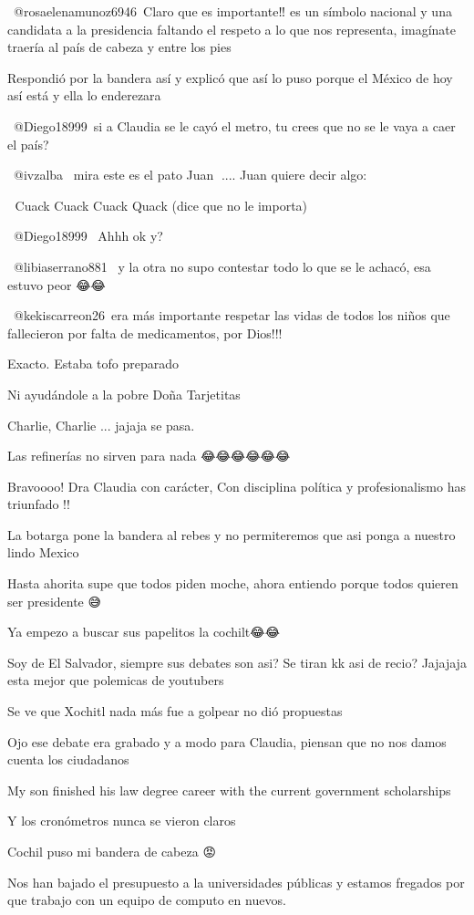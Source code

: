 ​ @rosaelenamunoz6946 Claro que es importante‼️ es un símbolo nacional y una candidata a la presidencia faltando el respeto a lo que nos representa, imagínate traería al país de cabeza y entre los pies

Respondió por la bandera así y explicó que así lo puso porque el México de hoy así está y ella lo enderezara

​ @Diego18999 si a Claudia se le cayó el metro, tu crees que no se le vaya a caer el país?

 @ivzalba  mira este es el pato Juan 🦆.... Juan quiere decir algo:


🦆 Cuack Cuack Cuack Quack (dice que no le importa)

 @Diego18999  Ahhh ok y?🤷🏻‍♀️

​ @libiaserrano881  y la otra no supo contestar todo lo que se le achacó, esa estuvo peor 😂😂

​ @kekiscarreon26 era más importante respetar las vidas de todos los niños que fallecieron por falta de medicamentos, por Dios!!!

Exacto. Estaba tofo preparado

Ni ayudándole a la pobre Doña Tarjetitas

Charlie, Charlie ... jajaja se pasa.

Las refinerías no sirven para nada 😂😂😂😂😂😂

Bravoooo! Dra Claudia con carácter,
Con disciplina política y profesionalismo has triunfado !!

La botarga pone la bandera al rebes y no permiteremos que asi ponga a nuestro lindo Mexico

Hasta ahorita supe que todos piden moche, ahora entiendo porque todos quieren ser presidente 😅

Ya empezo a buscar sus papelitos la cochilt😂😂

Soy de El Salvador, siempre sus debates son asi? Se tiran kk asi de recio? Jajajaja esta mejor que polemicas de youtubers

Se ve que Xochitl nada más fue  a golpear no dió propuestas👊

Ojo ese debate era grabado y a modo para Claudia, piensan que no nos damos cuenta los ciudadanos

My son finished his law degree career with the current government scholarships

Y los cronómetros nunca se vieron claros

Cochil puso mi bandera de cabeza 😡

Nos han bajado el presupuesto a la universidades públicas y estamos fregados por que trabajo con un equipo de computo en nuevos.

